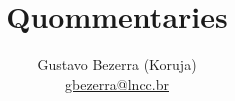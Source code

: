 \documentclass{article}
\title{Quommentaries}
\author{
    Gustavo Bezerra (Koruja)\\
    \href{mailto:gbezerra@lncc.br}{gbezerra@lncc.br}
}
\begin{document}
	\maketitle

	\tableofcontents
	\pagebreak

	
	
	
	
	
	
	
	
\end{document}
